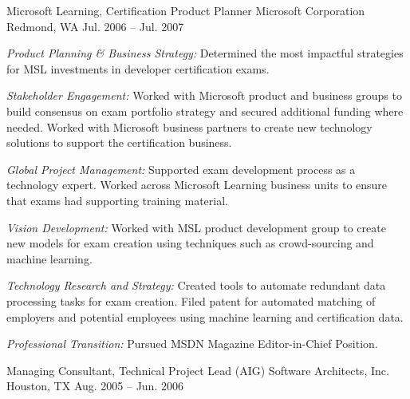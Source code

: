 \begin{cventries}
\cventry 
{Microsoft Learning, Certification Product Planner}
{Microsoft Corporation}
{Redmond, WA}
{Jul. 2006 – Jul. 2007}
{ %
\begin{cvitems}
\item {\emph{Product Planning \& Business Strategy:} Determined the most impactful strategies for MSL investments in developer certification exams.}
\item {\emph{Stakeholder Engagement:} Worked with Microsoft product and business groups to build consensus on exam portfolio strategy and secured additional funding where needed. Worked with Microsoft business partners to create new technology solutions to support the certification business.}
\item {\emph{Global Project Management:} Supported exam development process as a technology expert. Worked across Microsoft Learning business units to ensure that exams had supporting training material.}
\item {\emph{Vision Development:} Worked with MSL product development group to create new models for exam creation using techniques such as crowd-sourcing and machine learning.}
\item {\emph{Technology Research and Strategy:} Created tools to automate redundant data processing tasks for exam creation. Filed patent for automated matching of employers and potential employees using machine learning and certification data.}
\item {\emph{Professional Transition:} Pursued MSDN Magazine Editor-in-Chief Position.}
\end{cvitems}
}


\cventry 
{Managing Consultant, Technical Project Lead (AIG)}
{Software Architects, Inc.}
{Houston, TX}
{Aug. 2005 – Jun. 2006}
{ %
}


\end{cventries}
